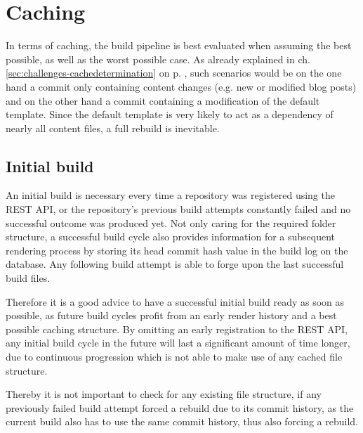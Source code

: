 \section{Caching}
\label{sec:caching}

In terms of caching, the build pipeline is best evaluated when assuming the best possible, as well as the worst possible case. As already explained in ch. \ref{sec:challenges-cachedetermination} on p. \pageref{sec:challenges-cachedetermination}, such scenarios would be on the one hand a commit only containing content changes (e.g. new or modified blog posts) and on the other hand a commit containing a modification of the default template. Since the default template is very likely to act as a dependency of nearly all content files, a full rebuild is inevitable.

\subsection{Initial build}
An initial build is necessary every time a repository was registered using the REST API, or the repository's previous build attempts constantly failed and no successful outcome was produced yet. Not only caring for the required folder structure, a successful build cycle also provides information for a subsequent rendering process by storing its head commit hash value in the build log on the database. Any following build attempt is able to forge upon the last successful build files.

Therefore it is a good advice to have a successful initial build ready as soon as possible, as future build cycles profit from an early render history and a best possible caching structure. By omitting an early registration to the REST API, any initial build cycle in the future will last a significant amount of time longer, due to continuous progression which is not able to make use of any cached file structure.



Thereby it is not important to check for any existing file structure, if any previously failed build attempt forced a rebuild due to its commit history, as the current build also has to use the same commit history, thus also forcing a rebuild.
